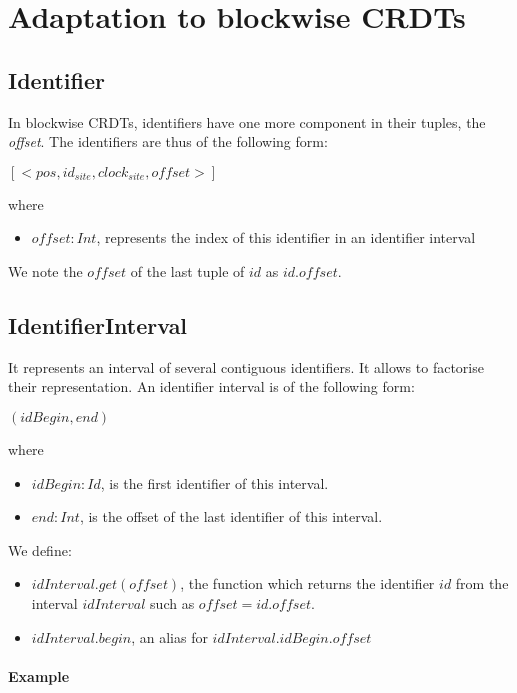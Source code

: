 \documentclass[a4paper]{article}
\begin{document}
\section{Adaptation to blockwise \acp{CRDT}}

\subsection{Identifier}

In blockwise \acp{CRDT}, identifiers have one more component in their tuples, the \emph{offset}.
The identifiers are thus of the following form:

\begin{center}
  $[<pos, id_{site}, clock_{site}, offset>]$
\end{center}
where
\begin{itemize}
  \item $offset: Int$, represents the index of this identifier in an identifier interval
\end{itemize}

We note the $offset$ of the last tuple of $id$ as $id.offset$.

\subsection{IdentifierInterval}

It represents an interval of several contiguous identifiers.
It allows to factorise their representation.
An identifier interval is of the following form:

\begin{center}
  $(idBegin, end)$
\end{center}
where
\begin{itemize}
  \item $idBegin: Id$, is the first identifier of this interval.
  \item $end: Int$, is the offset of the last identifier of this interval.
\end{itemize}

We define:
\begin{itemize}
  \item $idInterval.get(offset)$, the function which returns the identifier $id$
    from the interval $idInterval$ such as $offset = id.offset$.
  \item $idInterval.begin$, an alias for $idInterval.idBegin.offset$
\end{itemize}

\paragraph{Example}~\\
\end{document}
